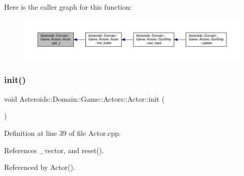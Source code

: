 Here is the caller graph for this function\+:\nopagebreak
\begin{figure}[H]
\begin{center}
\leavevmode
\includegraphics[width=350pt]{classAsteroids_1_1Domain_1_1Game_1_1Actors_1_1Actor_afa54aab6e7be56e04014dd3f80f0e7af_icgraph}
\end{center}
\end{figure}
\mbox{\label{classAsteroids_1_1Domain_1_1Game_1_1Actors_1_1Actor_a5f59fc92345120fdc67675ec0884b137}} 
\subsubsection{\texorpdfstring{init()}{init()}}
{\footnotesize\ttfamily void Asteroids\+::\+Domain\+::\+Game\+::\+Actors\+::\+Actor\+::init (\begin{DoxyParamCaption}{ }\end{DoxyParamCaption})\hspace{0.3cm}{\ttfamily [private]}}



Definition at line 39 of file Actor.\+cpp.



References \+\_\+vector, and reset().



Referenced by Actor().


